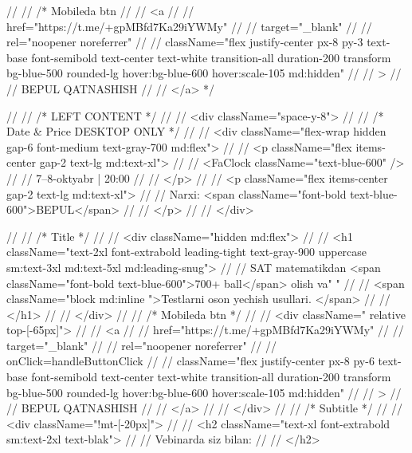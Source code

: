 {// //                 {/* Mobileda btn
// //                 <a
// //                     href="https://t.me/+gpMBfd7Ka29iYWMy"
// //                     target="_blank"
// //                     rel="noopener noreferrer"
// //                     className="flex justify-center px-8 py-3 text-base font-semibold text-center text-white transition-all duration-200 transform bg-blue-500 rounded-lg hover:bg-blue-600 hover:scale-105 md:hidden"
// //                 >
// //                     BEPUL QATNASHISH
// //                 </a> */}

// //                 {/* LEFT CONTENT */}
// //                 <div className="space-y-8">
// //                     {/* Date & Price DESKTOP ONLY */}
// //                     <div className="flex-wrap hidden gap-6 font-medium text-gray-700 md:flex">
// //                         <p className="flex items-center gap-2 text-lg md:text-xl">
// //                             <FaClock className="text-blue-600" />
// //                             7–8-oktyabr | 20:00
// //                         </p>
// //                         <p className="flex items-center gap-2 text-lg md:text-xl">
// //                             Narxi: <span className="font-bold text-blue-600">BEPUL</span>
// //                         </p>
// //                     </div>

// //                     {/* Title */}
// //                     <div className="hidden md:flex">
// //                         <h1 className="text-2xl font-extrabold leading-tight text-gray-900 uppercase sm:text-3xl md:text-5xl md:leading-snug">
// //                             SAT matematikdan <span className="font-bold text-blue-600">700+ ball</span> olish va{" "}
// //                             <span className="block md:inline ">Testlarni oson yechish usullari. </span>
// //                         </h1>
// //                     </div>
// //                     {/* Mobileda btn */}
// //                     <div className=" relative top-[-65px]">
// //                         <a
// //                             href="https://t.me/+gpMBfd7Ka29iYWMy"
// //                             target="_blank"
// //                             rel="noopener noreferrer"
// //                             onClick={handleButtonClick}
// //                             className="flex justify-center px-8 py-6 text-base font-semibold text-center text-white transition-all duration-200 transform bg-blue-500 rounded-lg hover:bg-blue-600 hover:scale-105 md:hidden"
// //                         >
// //                             BEPUL QATNASHISH
// //                         </a>
// //                     </div>
// //                     {/* Subtitle */}
// //                     <div className="!mt-[-20px]">
// //                         <h2 className="text-xl font-extrabold sm:text-2xl text-blak">
// //                             Vebinarda siz bilan:
// //                         </h2>

}
